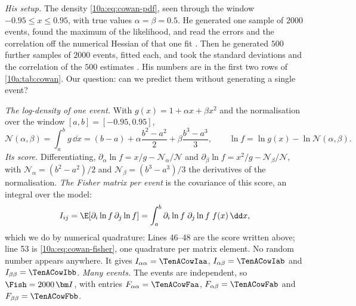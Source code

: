 \emph{His setup.} The density \eqref{10a:eq:cowan-pdf}, seen through the window $-0.95\le x\le0.95$, with true
values $\alpha=\beta=0.5$. He generated one sample of $2000$ events, found the maximum of the likelihood, and
read the errors and the correlation off the numerical Hessian of that one fit . Then he
generated $500$ further samples of $2000$ events, fitted each, and took the standard deviations and the
correlation of the $500$ estimates . His numbers are in the first two rows of
\cref{10a:tab:cowan}. Our question: can we predict them without generating a single event?

\emph{The log-density of one event.} With $g(x)=1+\alpha x+\beta x^2$ and the normalisation over the window
$[a,b]=[-0.95,0.95]$,
\[
  \mathcal N(\alpha,\beta)=\int_a^bg\,\dd x=(b-a)+\alpha\frac{b^2-a^2}2+\beta\frac{b^3-a^3}3,
  \qquad
  \ln f=\ln g(x)-\ln\mathcal N(\alpha,\beta).
\]
\emph{Its score.} Differentiating, $\partial_\alpha\ln f=x/g-\mathcal N_\alpha/\mathcal N$ and
$\partial_\beta\ln f=x^2/g-\mathcal N_\beta/\mathcal N$, with $\mathcal N_\alpha=(b^2-a^2)/2$ and
$\mathcal N_\beta=(b^3-a^3)/3$ the derivatives of the normalisation.
\emph{The Fisher matrix per event} is the covariance of this score, an integral over the model:
\begin{equation}
  I_{ij}=\E[\partial_i\ln f\,\partial_j\ln f]=\int_a^b\partial_i\ln f\;\partial_j\ln f\;f(x)\,\dd x,
  \label{10a:eq:cowan-fisher}
\end{equation}
which we do by numerical quadrature:
Lines 46--48 are the score written above; line 53 is \eqref{10a:eq:cowan-fisher}, one quadrature per matrix
element. No random number appears anywhere. It gives $I_{\alpha\alpha}=\TenACowIaa$, $I_{\alpha\beta}=\TenACowIab$ and
$I_{\beta\beta}=\TenACowIbb$. \emph{Many events.} The events are independent, so $\Fish=2000\,\bm I$, with
entries $F_{\alpha\alpha}=\TenACowFaa$, $F_{\alpha\beta}=\TenACowFab$ and $F_{\beta\beta}=\TenACowFbb$.

